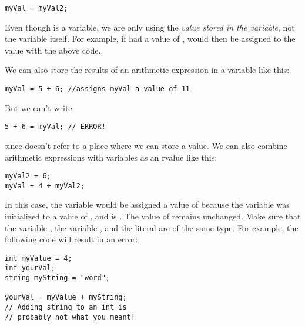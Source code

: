 \noindent\begin{minipage}{\linewidth}\begin{lstlisting}
myVal = myVal2;
\end{lstlisting}\end{minipage}

Even though  is a variable, we are only using the \textit{value stored in the variable}, not the variable itself. 
For example, if  had a value of ,  would then be assigned to the value  with the above code. 

We can also store the results of an arithmetic expression in a variable like this: 

\noindent\begin{minipage}{\linewidth}\begin{lstlisting}
myVal = 5 + 6; //assigns myVal a value of 11
\end{lstlisting}\end{minipage}

\noindent But we can't write

\noindent\begin{minipage}{\linewidth}\begin{lstlisting}
5 + 6 = myVal; // ERROR!
\end{lstlisting}\end{minipage}

\noindent since  doesn't refer to a place where we can store a value. 
We can also combine arithmetic expressions with variables as an rvalue like this:

\noindent\begin{minipage}{\linewidth}\begin{lstlisting}
myVal2 = 6;
myVal = 4 + myVal2;
\end{lstlisting}\end{minipage}

In this case, the variable  would be assigned a value of  because the variable  was initialized to a value of , and  is .
The value of  remains unchanged. 
Make sure that the variable , the variable , and the literal  are of the same type. 
For example, the following code will result in an error:

\noindent\begin{minipage}{\linewidth}\begin{lstlisting}
int myValue = 4;
int yourVal;
string myString = "word";
		
yourVal = myValue + myString; 
// Adding string to an int is
// probably not what you meant!
\end{lstlisting}\end{minipage}

